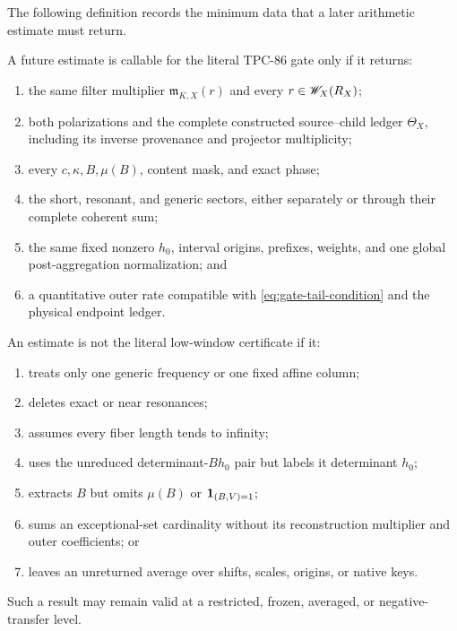 The following definition records the minimum data that a later
arithmetic estimate must return.

\begin{definition}
\label{def:callable-low-window}
A future estimate is callable for the literal TPC-86 gate only if it
returns:
\begin{enumerate}[label=(\roman*),leftmargin=2.2em]
\item the same filter multiplier
\(\mathfrak m_{K,X}(r)\) and every \(r\in\mathscr W_X(R_X)\);
\item both polarizations and the complete constructed source--child
ledger \(\Theta_X\), including its inverse provenance and projector
multiplicity;
\item every \(c,\kappa,B,\mu(B)\), content mask, and exact phase;
\item the short, resonant, and generic sectors, either separately or
through their complete coherent sum;
\item the same fixed nonzero \(h_0\), interval origins, prefixes,
weights, and one global post-aggregation normalization; and
\item a quantitative outer rate compatible with
\eqref{eq:gate-tail-condition} and the physical endpoint ledger.
\end{enumerate}
\end{definition}

\begin{proposition}
\label{prop:low-window-downgrade}
An estimate is not the literal low-window certificate if it:
\begin{enumerate}[label=(\alph*),leftmargin=2.2em]
\item treats only one generic frequency or one fixed affine column;
\item deletes exact or near resonances;
\item assumes every fiber length tends to infinity;
\item uses the unreduced determinant-\(Bh_0\) pair but labels it
determinant \(h_0\);
\item extracts \(B\) but omits \(\mu(B)\) or
\(\mathbf 1_{(B,V)=1}\);
\item sums an exceptional-set cardinality without its reconstruction
multiplier and outer coefficients; or
\item leaves an unreturned average over shifts, scales, origins, or
native keys.
\end{enumerate}
Such a result may remain valid at a restricted, frozen, averaged, or
negative-transfer level.
\end{proposition}

